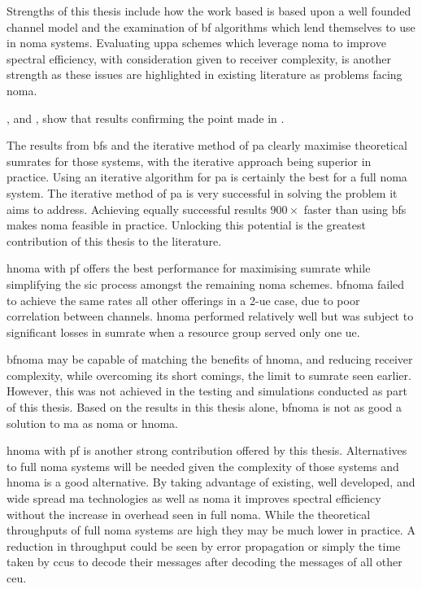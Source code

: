 \par
Strengths of this thesis include how the work based is based upon a well founded channel model and the examination of \ac{bf} algorithms which lend themselves to use in \ac{noma} systems.
Evaluating \ac{uppa} schemes which leverage \ac{noma} to improve spectral efficiency, with consideration given to receiver complexity, is another strength as these issues are highlighted in existing literature as problems facing \ac{noma}.

\par
{}, and , show that results confirming the point made in .

\par
The results from \ac{bfs} and the iterative method of \ac{pa} clearly maximise theoretical sumrates for those systems, with the iterative approach being superior in practice.
Using an iterative algorithm for \ac{pa} is certainly the best for a full \ac{noma} system. 
The iterative method of \ac{pa} is very successful in solving the problem it aims to address.
Achieving equally successful results $900\times$ faster than using \ac{bfs} makes \ac{noma} feasible in practice.
Unlocking this potential is the greatest contribution of this thesis to the literature.

\par
\ac{hnoma} with \ac{pf} offers the best performance for maximising sumrate while simplifying the \ac{sic} process amongst the remaining \ac{noma} schemes. 
\ac{bfnoma} failed to achieve the same rates all other offerings in a 2-\ac{ue} case, due to poor correlation between channels.
\ac{hnoma} performed relatively well but was subject to significant losses in sumrate when a resource group served only one \ac{ue}.

\par
\ac{bfnoma} may be capable of matching the benefits of \ac{hnoma}, and reducing receiver complexity, while overcoming its short comings, the limit to sumrate seen earlier.
However, this was not achieved in the testing and simulations conducted as part of this thesis.
Based on the results in this thesis alone, \ac{bfnoma} is not as good a solution to \ac{ma} as \ac{noma} or \ac{hnoma}.

\par
\ac{hnoma} with \ac{pf} is another strong contribution offered by this thesis.
Alternatives to full \ac{noma} systems will be needed given the complexity of those systems and \ac{hnoma} is a good alternative.
By taking advantage of existing, well developed, and wide spread \ac{ma} technologies as well as \ac{noma} it improves spectral efficiency without the increase in overhead seen in full \ac{noma}.
While the theoretical throughputs of full \ac{noma} systems are high they may be much lower in practice.
A reduction in throughput could be seen by error propagation or simply the time taken by \acp{ccu} to decode their messages after decoding the messages of all other \ac{ceu}.

